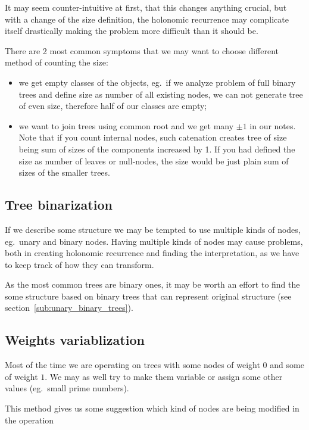 \documentclass[final]{article}
\theoremstyle{definition}
\theoremstyle{remark}
\begin{document}
It may seem counter-intuitive at first, that this changes anything crucial, but with a change of the size definition, the holonomic recurrence may complicate itself drastically making the problem more difficult than it should be.

There are 2 most common symptoms that we may want to choose different method of counting the size:
\begin{itemize}
    \item we get empty classes of the objects, eg.\ if we analyze problem of full binary trees and define size as number of all existing nodes, we can not generate tree of even size, therefore half of our classes are empty;
    \item we want to join trees using common root and we get many \(\pm1\) in our notes. Note that if you count internal nodes, such catenation creates tree of size being sum of sizes of the components increased by 1. If you had defined the size as number of leaves or null-nodes, the size would be just plain sum of sizes of the smaller trees.
\end{itemize}

\subsection{Tree binarization}%
\label{sub:tree_binarization}

If we describe some structure we may be tempted to use multiple kinds of nodes, eg.~unary and binary nodes. Having multiple kinds of nodes may cause problems, both in creating holonomic recurrence and finding the interpretation, as we have to keep track of how they can transform.

As the most common trees are binary ones, it may be worth an effort to find the some structure based on binary trees that can represent original structure (see section~\ref{sub:unary_binary_trees}).

\subsection{Weights variablization}%
\label{sub:weights_variablization}

Most of the time we are operating on trees with some nodes of weight \(0\) and some of weight \(1\). We may as well try to make them variable or assign some other values (eg.\ small prime numbers).

This method gives us some suggestion which kind of nodes are being modified in the operation
\end{document}
